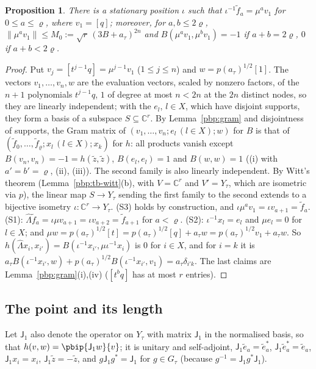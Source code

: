 \documentclass[10pt]{amsart}
\newtheorem{proposition}[theorem]{Proposition}
\theoremstyle{definition}
\theoremstyle{remark}
\newcommand{\C}{\mathbb C}
\begin{document}
\begin{proposition}\label{pbp:stationary}
There is a stationary position $\iota$ such that $\iota^{-1}\tilde f_a=\mu^av_1$ for $0\le a\le\varrho$,
where $v_1=[q]$; moreover, for $a,b\le2\varrho$, $\|\mu^av_1\|\le M_0:=\sqrt r\,(3B+a_\tau)^{2n}$ and
$B(\mu^av_1,\mu^bv_1)=-1$ if $a+b=2\varrho$, $0$ if $a+b<2\varrho$.
\end{proposition}
\begin{proof}
Put $v_j=[t^{j-1}q]=\mu^{j-1}v_1$ ($1\le j\le n$) and $w=p(a_\tau)^{1/2}[1]$. The vectors $v_1,\dots,
v_n,w$ are the evaluation vectors, scaled by nonzero factors, of the $n+1$ polynomials $t^{j-1}q$, $1$
of degree at most $n<2n$ at the $2n$ distinct nodes, so they are linearly independent; with the $e_l$,
$l\in X$, which have disjoint supports, they form a basis of a subspace $S\subseteq\C^r$. By
Lemma~\ref{pbp:gram} and disjointness of supports, the Gram matrix of $(v_1,\dots,v_n;e_l\,(l\in X);w)$
for $B$ is that of $(\tilde f_0,\dots,\tilde f_\varrho;x_l\,(l\in X);x_k)$ for $h$: all products vanish
except $B(v_n,v_n)=-1=h(\tilde z,\tilde z)$, $B(e_l,e_l)=1$ and $B(w,w)=1$ ((i) with $a'=b'=\varrho$,
(ii), (iii)). The second family is also linearly independent. By Witt's theorem (Lemma~\ref{pbp:tb-witt}(b),
with $V=\C^r$ and $V'=Y_\tau$, which are isometric via $p$), the linear map $S\to Y_\tau$ sending the
first family to the second extends to a bijective isometry $\iota\colon\C^r\to Y_\tau$. (S3) holds by
construction, and $\iota\mu^av_1=\iota v_{a+1}=\tilde f_a$. (S1): $\widehat\Lambda\tilde f_a=\iota\mu
v_{a+1}=\iota v_{a+2}=\tilde f_{a+1}$ for $a<\varrho$. (S2): $\iota^{-1}x_l=e_l$ and $\mu e_l=0$ for
$l\in X$; and $\mu w=p(a_\tau)^{1/2}[t]=p(a_\tau)^{1/2}[q]+a_\tau w=p(a_\tau)^{1/2}v_1+a_\tau w$. So
$h(\widehat\Lambda x_i,x_{i'})=B(\iota^{-1}x_{i'},\mu\iota^{-1}x_i)$ is $0$ for $i\in X$, and for $i=k$
it is $a_\tau B(\iota^{-1}x_{i'},w)+p(a_\tau)^{1/2}B(\iota^{-1}x_{i'},v_1)=a_\tau\delta_{i'k}$. The last
claims are Lemma~\ref{pbp:gram}(i),(iv) ($[t^bq]$ has at most $r$ entries).
\end{proof}

\subsection{The point and its length}\label{pbp:ss-point}

Let $\mathsf J_1$ also denote the operator on $Y_\tau$ with matrix $\mathsf J_1$ in the normalised basis,
so that $h(v,w)=\pbip{\mathsf J_1w}{v}$; it is unitary and self-adjoint, $\mathsf J_1\tilde e_a=\tilde
e_a^*$, $\mathsf J_1\tilde e_a^*=\tilde e_a$, $\mathsf J_1x_i=x_i$, $\mathsf J_1\tilde z=-\tilde z$, and
$g\mathsf J_1g^*=\mathsf J_1$ for $g\in G_\tau$ (because $g^{-1}=\mathsf J_1g^*\mathsf J_1$).
\end{document}
